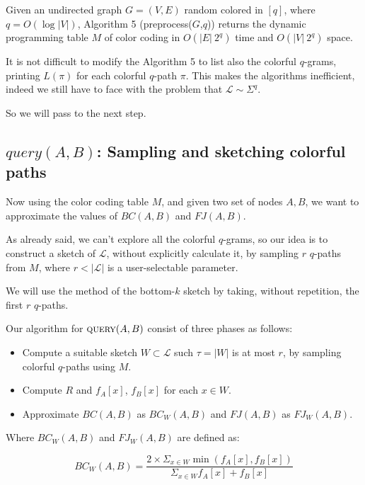 \begin{lemma}
	Given an undirected graph $G=(V, E)$ random colored in $[q]$, where $q = O(\log |V|)$, Algorithm 5 (preprocess($G$,$q$)) returns the dynamic programming table $M$ of color coding in $O(|E|\ 2^{q})$ time and $O(|V|\ 2^{q})$ space. 
\end{lemma}

\bigskip

It is not difficult to modify the Algorithm 5 to list also the colorful $q$-grams, printing $L(\pi)$ for each colorful $q$-path $\pi$. This makes the algorithms inefficient, indeed we still have to face with the problem that $\mathcal{L} \sim \Sigma^{q}$.\bigskip

So we will pass to the next step.

\subsection*{$query(A,B)$: Sampling and sketching colorful paths}

Now using the color coding table $M$, and given two set of nodes $A, B$, we want to approximate the values of $BC(A,B)$ and $FJ(A,B)$.\bigskip

As already said, we can't explore all the colorful $q$-grams, so our idea is to construct a sketch of $\mathcal{L}$, without explicitly calculate it, by sampling $r$ $q$-paths from $M$, where $r < |\mathcal{L}|$ is a user-selectable parameter.

We will use the method of the bottom-$k$ sketch by taking, without repetition, the first $r$ $q$-paths. \bigskip 

\clearpage

Our algorithm for $\textsc{query}(A,B)$ consist of three phases as follows:

\begin{itemize}
	\item Compute a suitable sketch $W \subset \mathcal{L}$ such $\tau = |W|$ is at most $r$, by sampling colorful $q$-paths using $M$.
	\item Compute $R$ and $f_{A}[x]$, $f_{B}[x]$ for each $x \in W$.
	\item Approximate $BC(A,B)$ as $BC_{W}(A,B)$ and $FJ(A,B)$ as $FJ_{W}(A,B)$.
\end{itemize}

Where $BC_{W}(A,B)$ and $FJ_{W}(A,B)$ are defined as:

\begin{equation}\label{bc-w}
	BC_{W}(A,B) = \frac{ 2 \times \Sigma_{x \in W} \min(f_{A}[x], f_{B}[x]) }{ \Sigma_{x \in W} f_{A}[x] + f_{B}[x] }
\end{equation}

